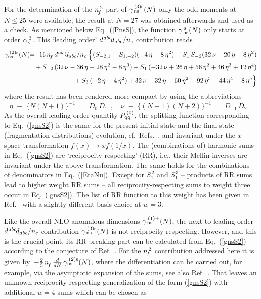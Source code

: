\documentclass[12pt]{article}
\newcommand{\hspn}{{\hspace{-4mm}}}
\newcommand{\beq}{\begin{equation}}
\newcommand{\eeq}{\end{equation}}
\newcommand{\bea}{\begin{eqnarray}}
\newcommand{\eea}{\end{eqnarray}}
\newcommand{\nn}{\nonumber}
\begin{document}
For the determination of the ${n^{\,2}_{\! f}}$ part of $\gamma^{\,(3)\rm s}_{\,\rm ns}(N)$
only the odd moments at $N \leq 25$ were available; the result at $N = 27$
was obtained afterwards and used as a check. As mentioned below 
Eq.~(\ref{PnsS}), the function $\gamma^{\;\rm s}_{\,\rm ns}(N)$ only starts at 
order $\as(3)$. This `leading order' ${d^{\:\!abc\!}d_{abc}/n_c}$ contribution reads
%
\bea
\label{gnsS2}
 \gamma_{\rm ns}^{\:(2)\rm s}(N) &\!\!=\!\!&
 16\*\, \nf\*\, \dabctnc \*\:
    \Big\{
    ( \Ss(-2,1) - \Ss(1,-2) ) \* (-4\*\,\eta-8\*\,\eta^2)
    - \S(1) \*\, \S(-2) \* (32\*\,\nu-20\*\,\eta-8\*\,\eta^2)
\nn \\ & & \mbox{\hspn}
    + \S(-2) \*\, (32\*\,\nu-36\*\,\eta-28\*\,\eta^2-8\*\,\eta^3)
    + \S(1) \*\, (-32\*\,\nu+26\*\,\eta+56\*\,\eta^2+46\*\,\eta^3+12\*\,\eta^4)
\nn \\[0.5mm] & & \mbox{\hspn}
    + \S(3) \*\, (-2\*\,\eta-4\*\,\eta^2)
    + 32\*\,\nu-32\*\,\eta-60\*\,\eta^2-92\*\,\eta^3-44\*\,\eta^4-8\*\,\eta^5
    \Big\}
\eea
%
where the result has been rendered more compact by using the abbreviations 
%
\beq
\label{EtaNu}
  \eta \;\equiv \; \{ N (N+1) \}^{-1} \;=\; D_0\, D_1
\:\: , \quad
  \nu \;\equiv \; \{ (N-1)(N+2) \}^{-1} \;=\; D_{-1}\, D_2 
\:\: .
\eeq
%
As the overall leading-order quantity $P_{\rm qq}^{\,(0)}$, the splitting 
function corresponding to Eq.~(\ref{gnsS2}) is the same for the present 
initial-state and the final-state (fragmentation distributions) evolution, 
cf.~Refs.~\cite{CFP80,SV96,mmvPnsT}, and invariant  under the $x$-space 
transformation $f(x) \rightarrow x f(1/x)$. The (combinations of) harmonic
sums in Eq.~(\ref{gnsS2}) are `reciprocity respecting' (RR), i.e., their 
Mellin inverses are invariant under the above transformation. The same holds
for the combinations of denominators in Eq.~(\ref{EtaNu}). 
Except for $S_1^{\,2}$ and $S_1^{\,3}$ -- products of RR sums lead to higher 
weight RR sums -- all reciprocity-respecting sums to weight three occur in
Eq.~(\ref{gnsS2}). The list of RR function to this weight has been given in 
Ref.~\cite{VelizTrv} with a slightly different basis choice at $w=3$.

Like the overall NLO anomalous dimensions $\gamma_{\,\rm ns}^{\:(1)\pm}(N)$, 
the next-to-leading order ${d^{\:\!abc\!}d_{abc}/n_c}$ contribution 
$\gamma_{\,\rm ns}^{\:(3)\rm s}(N)$ is not reciprocity-respecting.
However, and this is the crucial point, its RR-breaking part can be calculated 
from Eq.~(\ref{gnsS2}) according to the conjecture of Ref.~\cite{DMS05}. 
For the ${n^{\,2}_{\! f}}$ contribution addressed here it is given by 
$\,-\frac{2}{3}\,{n^{}_{\! f}}\, \frac{d}{dN}\, \gamma_{\rm ns}^{\:(2)\rm s}(N)$,
where the differentiation can be carried out, for example, via the asymptotic
expansion of the sums, see also Ref.~\cite{JBsums5}. That leaves an unknown 
reciprocity-respecting generalization of the form (\ref{gnsS2}) with 
additional $w=4$ sums which can be chosen as
\end{document}
